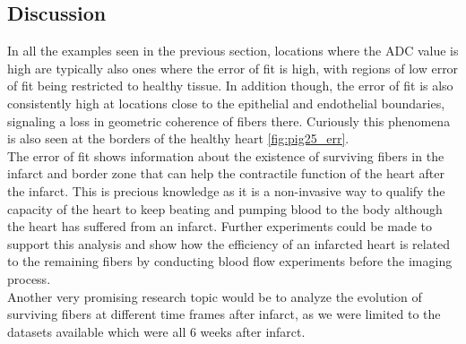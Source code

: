 \subsection{Discussion}

In all the examples seen in the previous section, locations where the ADC value is high are typically also ones where the error of fit is high, with regions of low error of fit being restricted to healthy tissue. In addition though, the error of fit is also consistently high at locations close to the epithelial and endothelial boundaries, signaling a loss in geometric coherence of fibers there. Curiously this phenomena is also seen at the borders of the healthy heart \ref{fig:pig25_err}.\\
The error of fit shows information about the existence of surviving fibers in the infarct and border zone that can help the contractile function of the heart after the infarct. This is precious knowledge as it is a non-invasive way to qualify the capacity of the heart to keep beating and pumping blood to the body although the heart has suffered from an infarct. Further experiments could be made to support this analysis and show how the efficiency of an infarcted heart is related to the remaining fibers by conducting blood flow experiments before the imaging process.\\
Another very promising research topic would be to analyze the evolution of surviving fibers at different time frames after infarct, as we were limited to the datasets available which were all 6 weeks after infarct.
